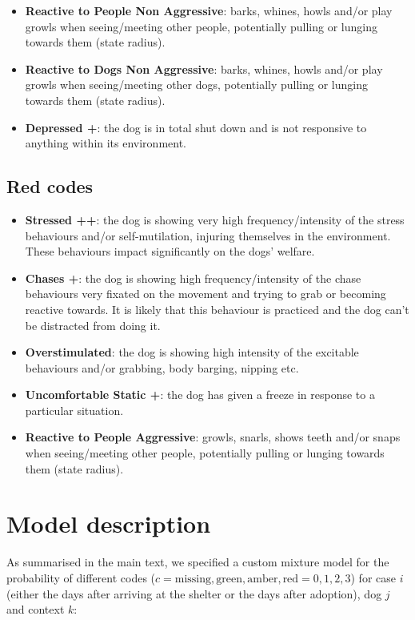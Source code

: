 \documentclass[12pt]{article}
\begin{document}
\begin{itemize}
  \item \textbf{Reactive to People Non Aggressive}: barks, whines, howls and/or play growls when seeing/meeting other people, potentially pulling or lunging towards them (state radius).
  \item \textbf{Reactive to Dogs Non Aggressive}: barks, whines, howls and/or play growls when seeing/meeting other dogs, potentially pulling or lunging towards them (state radius).
  \item \textbf{Depressed +}: the dog is in total shut down and is not responsive to anything
  within its environment.
\end{itemize}

\subsection{Red codes}

\begin{itemize}
  \item \textbf{Stressed ++}: the dog is showing very high frequency/intensity of the stress behaviours and/or self-mutilation, injuring themselves in the environment. These behaviours impact significantly on the dogs’ welfare.
  \item \textbf{Chases +}: the dog is showing high frequency/intensity of the chase behaviours very fixated on the movement and trying to grab or becoming reactive towards. It is likely that this behaviour is practiced and the dog can’t be distracted from doing it.
  \item \textbf{Overstimulated}: the dog is showing high intensity of the excitable behaviours and/or grabbing, body barging, nipping etc.
  \item \textbf{Uncomfortable Static +}: the dog has given a freeze in response to a particular situation.
  \item \textbf{Reactive to People Aggressive}: growls, snarls, shows teeth and/or snaps when seeing/meeting other people, potentially pulling or lunging towards them (state radius).

\end{itemize}
\newpage

\section{Model description}
As summarised in the main text, we specified a custom mixture model for the probability of different codes ($c = {\text{missing}, \text{green}, \text{amber}, \text{red}} = {0, 1, 2, 3}$) for case $i$ (either the days after arriving at the shelter or the days after adoption), dog $j$ and context $k$:
\end{document}

